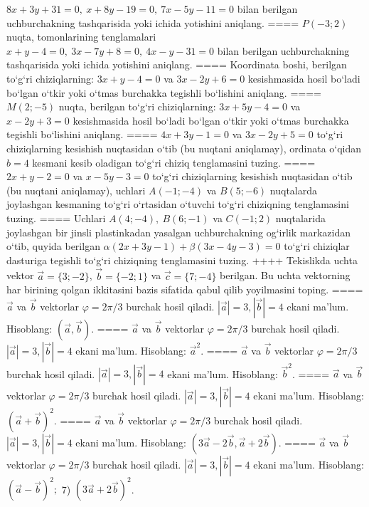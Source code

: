 \(8x+3y+31=0,\ x+8y-19=0,\ 7x-5y-11=0\) bilan
berilgan uchburchakning tashqarisida yoki ichida yotishini aniqlang.
====
\(P (-3;2) \) nuqta, tomonlarining tenglamalari
\(x+y-4=0,\ 3x-7y+8=0,\ 4x-y-31=0\) bilan
berilgan uchburchakning tashqarisida yoki ichida yotishini aniqlang.
====
Koordinata boshi, berilgan to‘g‘ri chiziqlarning:
\(3x+y-4=0\) va \(3x-2y+6=0\) kesishmasida hosil bo‘ladi
bo‘lgan o‘tkir yoki o‘tmas burchakka tegishli bo‘lishini aniqlang.
====
\(M (2;-5) \) nuqta, berilgan to‘g‘ri chiziqlarning:
\(3x+5y-4=0\) va \(x-2y+3=0\) kesishmasida hosil bo‘ladi
bo‘lgan o‘tkir yoki o‘tmas burchakka tegishli bo‘lishini aniqlang.
====
\(4x+3y-1=0\) va \(3x-2y+5=0\)
to‘g‘ri chiziqlarning kesishish nuqtasidan o‘tib (bu nuqtani aniqlamay), ordinata
o‘qidan \(b=4\) kesmani kesib oladigan to‘g‘ri chiziq tenglamasini tuzing.
====
\(2x+y-2=0\) va \(x-5y-3=0\)
to‘g‘ri chiziqlarning kesishish nuqtasidan o‘tib (bu nuqtani aniqlamay), uchlari
\(A (-1;-4) \) va \(B (5;-6) \) nuqtalarda joylashgan kesmaning
to‘g‘ri o‘rtasidan o‘tuvchi to‘g‘ri chiziqning tenglamasini tuzing.
====
Uchlari \(A (4;-4),\ B (6;-1) \) va \(C (-1;2) \)
nuqtalarida joylashgan bir jinsli plastinkadan yasalgan uchburchakning
og‘irlik markazidan o‘tib, quyida berilgan
\(\alpha (2x+3y-1) +\beta (3x-4y-3) =0\) to‘g‘ri chiziqlar dasturiga
tegishli to‘g‘ri chiziqning tenglamasini tuzing.
++++
Tekislikda uchta vektor $\vec{a} = \{ 3; - 2\}$, $\vec{b} = \{ - 2;1\}$ va $\vec{c} = \{ 7; - 4\}$ berilgan. Bu uchta vektorning har birining qolgan ikkitasini bazis sifatida qabul qilib yoyilmasini toping.
====
$\vec{a}$ va $\vec{b}$ vektorlar $\varphi = 2\pi/3$ burchak hosil qiladi. $|\vec{a}| = 3,|\vec{b}| = 4$ ekani ma’lum. Hisoblang:
$\left(\vec{a},\vec{b} \right) $.
====
$\vec{a}$ va $\vec{b}$ vektorlar $\varphi = 2\pi/3$ burchak hosil qiladi. $|\vec{a}| = 3,|\vec{b}| = 4$ ekani ma’lum. Hisoblang:
${\vec{a}}^{2}$.
====
$\vec{a}$ va $\vec{b}$ vektorlar $\varphi = 2\pi/3$ burchak hosil qiladi. $|\vec{a}| = 3,|\vec{b}| = 4$ ekani ma’lum. Hisoblang:
${\vec{b}}^{2}$.
====
$\vec{a}$ va $\vec{b}$ vektorlar $\varphi = 2\pi/3$ burchak hosil qiladi. $|\vec{a}| = 3,|\vec{b}| = 4$ ekani ma’lum. Hisoblang:
$ (\vec{a} + \vec{b}) ^{2}$.
====
$\vec{a}$ va $\vec{b}$ vektorlar $\varphi = 2\pi/3$ burchak hosil qiladi. $|\vec{a}| = 3,|\vec{b}| = 4$ ekani ma’lum. Hisoblang:
$\left(3\vec{a} - 2\vec{b},\vec{a} + 2\vec{b} \right) $.
====
$\vec{a}$ va $\vec{b}$ vektorlar $\varphi = 2\pi/3$ burchak hosil qiladi. $|\vec{a}| = 3,|\vec{b}| = 4$ ekani ma’lum. Hisoblang:
$ (\vec{a} - \vec{b}) ^{2};$ 7) $ (3\vec{a} + 2\vec{b}) ^{2}$.
